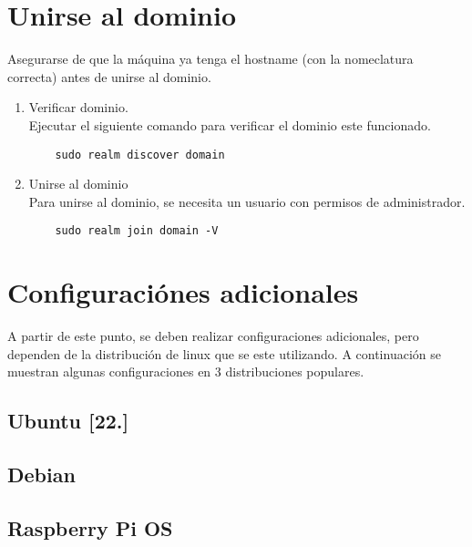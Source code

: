 \documentclass[11pt]{article}
\begin{document}
    \section{Unirse al dominio}
    \begin{tcolorbox}[important]
        Asegurarse de que la máquina ya tenga el hostname (con la nomeclatura correcta)  antes de unirse al dominio.
    \end{tcolorbox}
    \begin{enumerate}
        \item Verificar dominio. \\
       Ejecutar el siguiente comando para verificar el dominio este funcionado.
        \begin{lstlisting}
    sudo realm discover domain
        \end{lstlisting}

        \item Unirse al dominio \\
        Para unirse al dominio, se necesita un usuario con permisos de administrador.
        \begin{lstlisting}
    sudo realm join domain -V
        \end{lstlisting}
    \end{enumerate}


    \section{Configuraciónes adicionales}
    A partir de este punto, se deben realizar configuraciones adicionales, pero dependen de la distribución de linux que se este utilizando. A continuación se muestran algunas configuraciones en 3 distribuciones populares.

    \subsection{Ubuntu [22.] }


    \subsection{Debian}

    \subsection{Raspberry Pi OS}
    
    
\end{document}
